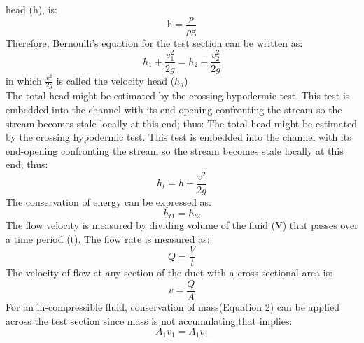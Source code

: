 \documentclass[12pt,a4paper]{article}
\begin{document}
head (h), is:
\begin{equation}
\text{h} = \frac{p}{\text{$\rho$g}}
\end{equation}
Therefore, Bernoulli’s equation for the test section can be written as:
\begin{equation}
h_1 + \frac{v_1^2}{2g} = h_2 + \frac{v_2^2}{2g}
\end{equation}
in which $\frac{v^2}{2g}$ is called the velocity head ($h_d$)\\
The total head might be estimated by the crossing hypodermic test. This
test is embedded into the channel with its end-opening confronting the
stream so the stream becomes stale locally at this end; thus:
The total head might be estimated by the crossing hypodermic test. This test is embedded into the channel with its end-opening confronting the stream so the stream becomes stale locally at this end; thus:
\begin{equation}
h_t  = h + \frac{v^2}{2g}
\end{equation}
The conservation of energy can be expressed as:
\begin{equation}
h_{t1}  = h_{t2} 
\end{equation}
The flow velocity is measured by dividing volume of the fluid (V) that passes over a time period (t). The flow rate is measured as:
\begin{equation}
Q  = \frac{V}{t}
\end{equation}
The velocity of flow at any section of the duct with a cross-sectional area is:
\begin{equation}
v  = \frac{Q}{A}
\end{equation}
For an in-compressible fluid, conservation of mass(Equation 2) can be applied across the test section since mass is not accumulating,that implies:
\begin{equation}
A_1 v_1  = A_1 v_1
\end{equation}
\end{document}

